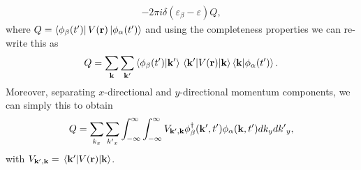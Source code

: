 \documentclass[
 reprint,
 amsmath,amssymb,
 aps,
 prb,
]{revtex4-2}
\begin{document}
\begin{appendix}
\begin{equation}
\begin{aligned}
    -2\pi i \delta(\varepsilon_{\beta} - \varepsilon)Q,
  \end{aligned}
\end{equation}
where $Q = \bra{\phi_{\beta}(t')} V(\vb{r}) \ket{\phi_{\alpha}(t')}$ and using the completeness properties we can re-write this as
\begin{equation} \label{eq:c18}
    Q =
    \sum_{\vb{k}}\sum_{\vb{k'}}
    \braket{\phi_{\beta}(t')}{\vb{k'}}
    \mel{\vb{k'}}{V(\vb{r})}{\vb{k}}
    \braket{\vb{k}}{\phi_{\alpha}(t')}.
\end{equation}
Moreover, separating $x$-directional and $y$-directional momentum components, we can simply this to obtain
\begin{equation} \label{eq:c19}
    Q =
    \sum_{k_x}\sum_{{k'}_x}
    \int_{-\infty}^{\infty} \int_{-\infty}^{\infty}
    V_{\vb{k'},\vb{k}}
    \phi_{\beta}^{\dagger}(\vb{k'},t')
    \phi_{\alpha}(\vb{k},t')  dk_y d{k'}_y,
\end{equation}
with $V_{\vb{k'},\vb{k}} = \mel{\vb{k'}}{V(\vb{r})}{\vb{k}}$.


\end{appendix}
\end{document}
